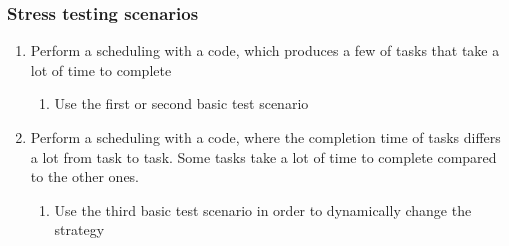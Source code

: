 {		
		     
		   \subsubsection{Stress testing scenarios}
		   
		   \begin{enumerate}
		   			
		   	\item Perform a scheduling with a code, which produces a few of tasks that take a lot of time to complete
		   	
		   	   \begin{enumerate}
		   			\item Use the first or second basic test scenario
		   	   \end{enumerate}
		   	\item Perform a scheduling with a code, where the completion time of tasks differs a lot from task to task. Some tasks take a lot of time to complete compared to the other ones.
		      	\begin{enumerate}
		   			\item Use the third basic test scenario  in order to dynamically change the strategy
		      	\end{enumerate}
		   \end{enumerate}	
}